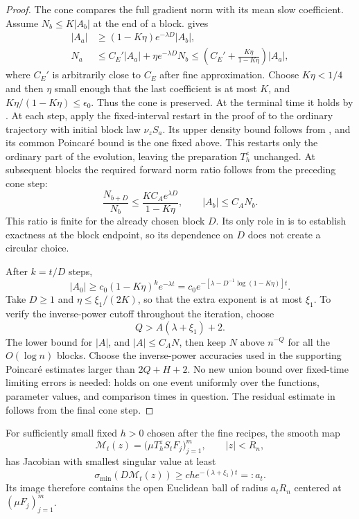 \begin{proof}
The cone compares the full gradient norm with its mean slow coefficient.
Assume $N_b\le K|A_b|$ at the end of a block.
 gives
\begin{align*}
 |A_a|&\ge(1-K\eta)e^{-\lambda D}|A_b|,\\
 N_a&\le C_E'|A_a|+\eta e^{-\lambda D}N_b
       \le\left(C_E'+\frac{K\eta}{1-K\eta}\right)|A_a|,
\end{align*}
where $C_E'$ is arbitrarily close to $C_E$ after fine approximation.
Choose $K\eta<1/4$ and then $\eta$ small enough that the last
coefficient is at most $K$, and
$K\eta/(1-K\eta)\le\epsilon_0$.  Thus the cone is preserved.
At the terminal time it holds by .
At each step, apply the fixed-interval restart in the proof of
 to the ordinary trajectory with
initial block law $\nu_zS_a$.  Its upper density bound follows from
, and
its common Poincar\'e bound is the one fixed above.  This restarts
only the ordinary part of the evolution, leaving the preparation
$T_h^z$ unchanged.  At subsequent blocks the required forward norm
ratio follows from the preceding cone step:
\[
 \frac{N_{b+D}}{N_b}
 \le\frac{K C_Ae^{\lambda D}}{1-K\eta},
 \qquad |A_b|\le C_A N_b.
\]
This ratio is finite for the already chosen block $D$.  Its only role
in  is to establish exactness at the block
endpoint, so its dependence on $D$ does not create a circular choice.

After $k=t/D$ steps,
\[
 |A_0|\ge c_0(1-K\eta)^k e^{-\lambda t}
 =c_0e^{-[\lambda-D^{-1}\log(1-K\eta)]t}.
\]
Take $D\ge1$ and $\eta\le\xi_1/(2K)$, so that the extra exponent
is at most $\xi_1$.  To verify the inverse-power cutoff throughout
the iteration, choose
\[
 Q>A(\lambda+\xi_1)+2.
\]
The lower bound for $|A|$, and $|A|\le C_A N$, then keep $N$ above
$n^{-Q}$ for all the $O(\log n)$ blocks.  Choose the inverse-power
accuracies used in the supporting Poincar\'e estimates larger than
$2Q+H+2$.  No new union bound over fixed-time limiting errors is
needed:  holds on one event uniformly over
the functions, parameter values, and comparison times in question.
The residual estimate in  follows from
the final cone step.
\end{proof}

\begin{lemma}
\label{lem:cutoff-jacobian}
For sufficiently small fixed $h>0$ chosen after the fine recipes,
the smooth map
\[
 \mathcal M_t(z)=\bigl(\mu T_h^z S_tF_j\bigr)_{j=1}^m,
 \qquad |z|<R_n,
\]
has Jacobian with smallest singular value at least
\begin{equation}
 \sigma_{\min}(D\mathcal M_t(z))
       \ge c h e^{-(\lambda+\xi_1)t}=:a_t.
 \label{eq:cutoff-jacobian}
\end{equation}
Its image therefore contains the open Euclidean ball of radius
$a_tR_n$ centered at $(\mu F_j)_{j=1}^m$.
\end{lemma}

